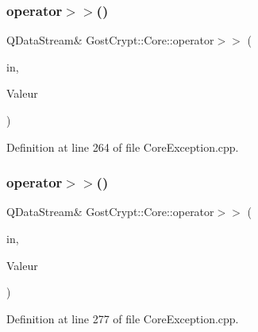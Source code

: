 \mbox{\label{namespace_gost_crypt_1_1_core_a81fbedf03a993369d1f2e0d6d5a954e5}} 
\subsubsection{\texorpdfstring{operator$>$$>$()}{operator>>()}\hspace{0.1cm}{\footnotesize\ttfamily [50/56]}}
{\footnotesize\ttfamily Q\+Data\+Stream\& Gost\+Crypt\+::\+Core\+::operator$>$$>$ (\begin{DoxyParamCaption}\item[{Q\+Data\+Stream \&}]{in,  }\item[{\hyperlink{class_gost_crypt_1_1_core_1_1_service_process_crashed}{Gost\+Crypt\+::\+Core\+::\+Service\+Process\+Crashed} \&}]{Valeur }\end{DoxyParamCaption})}



Definition at line 264 of file Core\+Exception.\+cpp.

\mbox{\label{namespace_gost_crypt_1_1_core_a2182019d17693ac4d96b01b5a7adf6b6}} 
\subsubsection{\texorpdfstring{operator$>$$>$()}{operator>>()}\hspace{0.1cm}{\footnotesize\ttfamily [51/56]}}
{\footnotesize\ttfamily Q\+Data\+Stream\& Gost\+Crypt\+::\+Core\+::operator$>$$>$ (\begin{DoxyParamCaption}\item[{Q\+Data\+Stream \&}]{in,  }\item[{\hyperlink{class_gost_crypt_1_1_core_1_1_fail_find_filesystem_type}{Gost\+Crypt\+::\+Core\+::\+Fail\+Find\+Filesystem\+Type} \&}]{Valeur }\end{DoxyParamCaption})}



Definition at line 277 of file Core\+Exception.\+cpp.

\mbox{\label{namespace_gost_crypt_1_1_core_a4023bff4ba5e83aaa44199bfd7977366}} 
